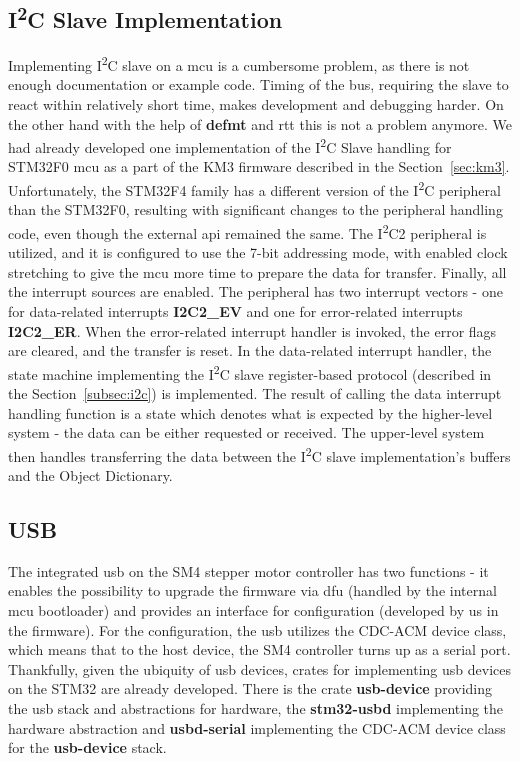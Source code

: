 \subsection{I\textsuperscript{2}C Slave Implementation}
\label{subsec:i2c_impl}
Implementing I\textsuperscript{2}C slave on a \acs{mcu} is a cumbersome problem, as there is not enough documentation or example code.
Timing of the bus, requiring the slave to react within relatively short time, makes development and debugging harder.
On the other hand with the help of \textbf{defmt} and \acs{rtt} this is not a problem anymore.
We had already developed one implementation of the I\textsuperscript{2}C Slave handling for STM32F0 \acs{mcu} as a part of the KM3 firmware described in the Section~\ref{sec:km3}.
Unfortunately, the STM32F4 family has a different version of the I\textsuperscript{2}C peripheral than the STM32F0, resulting with significant changes to the peripheral handling code, even though the external \acs{api} remained the same.
The I\textsuperscript{2}C2 peripheral is utilized, and it is configured to use the 7-bit addressing mode, with enabled clock stretching to give the \acs{mcu} more time to prepare the data for transfer.
Finally, all the interrupt sources are enabled.
The peripheral has two interrupt vectors - one for data-related interrupts \textbf{I2C2\_EV} and one for error-related interrupts \textbf{I2C2\_ER}.
When the error-related interrupt handler is invoked, the error flags are cleared, and the transfer is reset.
In the data-related interrupt handler, the state machine implementing the I\textsuperscript{2}C slave register-based protocol (described in the Section~\ref{subsec:i2c}) is implemented.
The result of calling the data interrupt handling function is a state which denotes what is expected by the higher-level system - the data can be either requested or received.
The upper-level system then handles transferring the data between the I\textsuperscript{2}C slave implementation's buffers and the Object Dictionary.

\subsection{USB}
\label{subsec:usb_impl}
The integrated \acs{usb} on the SM4 stepper motor controller has two functions - it enables the possibility to upgrade the firmware via \acs{dfu} (handled by the internal \acs{mcu} bootloader) and provides an interface for configuration (developed by us in the firmware).
For the configuration, the \acs{usb} utilizes the CDC-ACM device class, which means that to the host device, the SM4 controller turns up as a serial port.
Thankfully, given the ubiquity of \acs{usb} devices, crates for implementing \acs{usb} devices on the STM32 are already developed.
There is the crate \textbf{usb-device} providing the \acs{usb} stack and abstractions for hardware\cite{virkkunen_mvirkkunenusb-device_2021}, the \textbf{stm32-usbd}\cite{noauthor_stm32-rsstm32-usbd_2021} implementing the hardware abstraction and \textbf{usbd-serial}\cite{virkkunen_mvirkkunenusbd-serial_2021} implementing the CDC-ACM device class for the \textbf{usb-device} stack.

